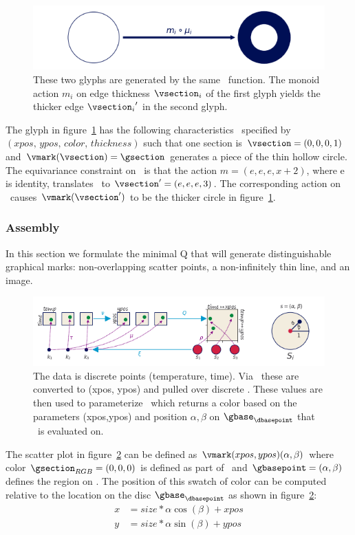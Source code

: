 \documentclass[../main.tex]{subfiles}
\begin{document}
\begin{figure}[H]
    \includegraphics[width=\textwidth]{figures/math/diff_type_q.png}
    \caption{These two glyphs are generated by the same \vmark\ function. The monoid 
    action $m_i$ on edge thickness $\vsection_i$ of the first glyph yields the thicker edge ${\vsection_i}^{\prime}$ in the second glyph.}
    \label{fig:artist_mark_change}
\end{figure}

The glyph in figure~\ref{fig:artist_mark_change} has the following characteristics \vfiber\ specified by  $(xpos,\, ypos,\, color,\, thickness)$ such that one section is $\vsection=(0,0,0,1)$ and $\vmark(\vsection) = \gsection$ generates a piece of the thin hollow circle. The equivariance constraint on \vmark\ is that the action $m=(e, e, e, x+2)$, where e is identity, translates \vsection\ to  $\vsection^{\prime}=(e,e,e,3)$. The corresponding action on \gsection\ causes $\vmark(\vsection^{\prime})$ to be the thicker circle in figure~\ref{fig:artist_mark_change}.
  

\subsubsection{Assembly \vmark}
In this section we formulate the minimal Q that will generate distinguishable graphical marks: non-overlapping scatter points, a non-infinitely thin line, and an image. 
\begin{figure}[H]
    \includegraphics[width=1\textwidth]{figures/math/scatter_with_s.png}
    \caption{The data is discrete points (temperature, time). Via \vchannel\ these are converted to (xpos, ypos) and pulled over discrete \gbase. These values are then used to parameterize \gsection\ which returns a color based on the parameters (xpos,ypos) and position $\alpha, \beta$ on $\gbase_{\dbasepoint}$ that \gsection\ is evaluated on. 
    }
    \label{fig:artist_scatter}
\end{figure}
The scatter plot in figure~\ref{fig:artist_scatter} can be defined as $\vmark(xpos, ypos)(\alpha, \beta)$ where color $\gsection_{RGB} = (0,0,0)$ is defined as part of \vmark\ and $\gbasepoint=(\alpha, \beta)$ defines the region on \gbase. The position of this swatch of color can be computed relative to the location on the disc $\gbase_{\dbasepoint}$ as shown in figure~\ref{fig:artist_scatter}:
\begin{align}
x &= size *\alpha \cos(\beta) + xpos \\
y &= size *\alpha \sin(\beta) + ypos
\end{align}
\end{document}
